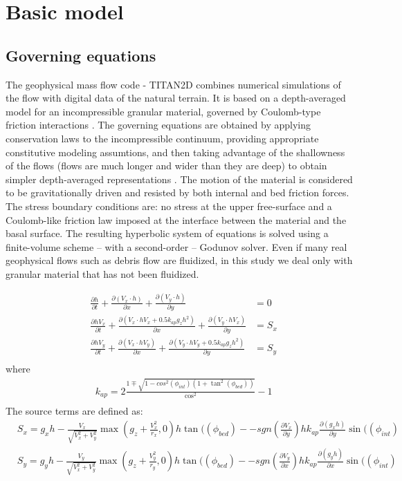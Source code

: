 \documentclass{article}
\begin{document}
\section{Basic model}
\subsection{Governing equations}
The geophysical mass flow code - TITAN2D combines numerical simulations of the flow with
digital data of the natural terrain. It is based on a depth-averaged
model for an incompressible granular material, governed by
Coulomb-type friction interactions \citep{Savage1989}.  The
governing equations are obtained by applying conservation laws to the
incompressible continuum, providing appropriate constitutive modeling
assumtions, and then taking advantage of the shallowness of the flows
(flows are much longer and wider than they are deep) to obtain simpler
depth-averaged representations \citep{Patra2005}. The motion of the
material is considered to be gravitationally driven and resisted by
both internal and bed friction forces. The stress boundary conditions
are: no stress at the upper free-surface and a Coulomb-like friction law
imposed at the interface between the material and the basal
surface. The resulting hyperbolic system of equations is solved using a
finite-volume scheme -- with a second-order -- Godunov solver. Even if many
real geophysical flows such as debris flow are fluidized, in this
study we deal only with granular material that has not been fluidized.

\begin{align} \nonumber
&\frac{\partial{h}}{\partial{t}} + \frac{\partial{(V_x \cdot h)}}{\partial{x}} + \frac{\partial{(V_y \cdot h)}}{\partial{y}} &= 0 \\ 
&\frac{\partial{hV_x}}{\partial{t}} + \frac{\partial{(V_x \cdot hV_x + 0.5 k_{ap}g_zh^2)}}{\partial{x}} + \frac{\partial{(V_y \cdot hV_x)}}{\partial{y}} &={S_x} \\  \nonumber
&\frac{\partial{hV_y}}{\partial{t}} + \frac{\partial{(V_x \cdot hV_y)}}{\partial{x}} + \frac{\partial{(V_y \cdot hV_y + 0.5 k_{ap}g_zh^2)}}{\partial{y}} &= S_y \\ \nonumber
\label{eqn1}
\end{align}
where 
\begin{align} \nonumber
&k_{ap} = 2\frac{1\mp \sqrt{1-cos^2(\phi_{int})(1+\tan^2(\phi_{bed}))}}{\cos^2} -  1  \\ \nonumber
\end{align}
The source terms are defined as:
\begin{align} 
&S_x = g_xh -\frac{V_x}{\sqrt{V_x^2+V_y^2}}\max{\left(g_z + \frac{V_x^2}{r_x}, 0 \right)} h \tan((\phi_{bed}) - 
-  sgn \left( \frac{\partial{V_x}}{\partial{y}} \right )h k_{ap} \frac{\partial{(g_xh)}}{\partial{y}} \sin((\phi_{int}) \\
&S_y = g_yh -\frac{V_y}{\sqrt{V_x^2+V_y^2}}\max{\left(g_z + \frac{V_y^2}{r_y}, 0 \right)} h \tan((\phi_{bed}) -  \nonumber
-  sgn \left( \frac{\partial{V_y}}{\partial{x}} \right )h k_{ap} \frac{\partial{(g_yh)}}{\partial{x}} \sin((\phi_{int}) \\  \nonumber
\end{align}
\end{document}
